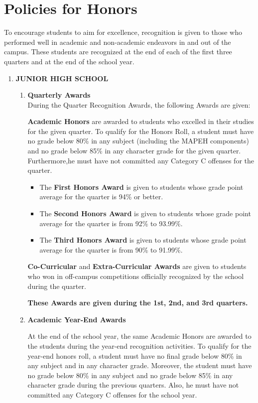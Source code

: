 \section{Policies for Honors}
To encourage students to aim for excellence, recognition is given to those who performed well in academic and non-academic endeavors in and out of the campus. These students are recognized at the end of each of the first three quarters and at the end of the school year.

\begin{enumerate}[label=(\Alph*)]
	\item \textbf{JUNIOR HIGH SCHOOL}
	
	\begin{enumerate}[label=\Alph{enumi}.\arabic*]
		\item \textbf{Quarterly Awards} \\
		During the Quarter Recognition Awards, the following Awards are given:
		
		\textbf{Academic Honors} are awarded to students who excelled in their studies for the given quarter. To qualify for the Honors Roll, a student must have no grade below 80\% in any subject (including the MAPEH components) and no grade below 85\% in any character grade for the given quarter. Furthermore,he must have not committed any Category C offenses for the quarter.
		\begin{itemize}
			\item The \textbf{First Honors Award} is given to students whose grade point average for the quarter is 94\% or better.
			\item The \textbf{Second Honors Award} is given to students whose grade point average for the quarter is from 92\% to 93.99\%.
			\item The \textbf{Third Honors Award} is given to students whose grade point
			average for the quarter is from 90\% to 91.99\%.
		\end{itemize}
		
		\textbf{Co-Curricular} and \textbf{ Extra-Curricular Awards} are given to students who won in off-campus competitions officially recognized by the school during the quarter.
		
		\textbf{These Awards are given during the 1st, 2nd, and 3rd quarters.}
		
		\item \textbf{Academic Year-End Awards}
		
		At the end of the school year, the same Academic Honors are awarded to the students during the year-end recognition activities. To qualify for the year-end honors roll, a student must have no final grade below 80\% in any subject and in any character grade. Moreover, the student must have no grade below 80\% in any subject and no grade below 85\% in any character grade during the previous quarters. Also, he must have not committed any Category C offenses for the school year.
		

\end{enumerate}
\end{enumerate}
